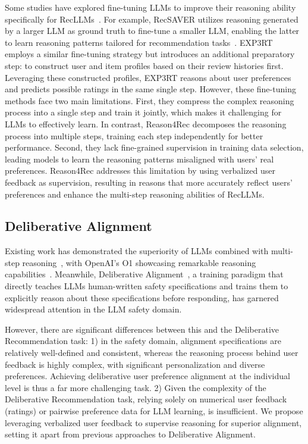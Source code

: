 Some studies have explored fine-tuning LLMs to improve their reasoning ability specifically for RecLLMs~\cite{expert,ACL_findings,ReasoingRec,RecReasonor}. 
For example, RecSAVER utilizes reasoning generated by a larger LLM as ground truth to fine-tune a smaller LLM, enabling the latter to learn reasoning patterns tailored for recommendation tasks~\cite{ACL_findings}.
EXP3RT~\cite{expert} employs a similar fine-tuning strategy but introduces an additional preparatory step: to construct user and item profiles based on their review histories first. 
Leveraging these constructed profiles, EXP3RT reasons about user preferences and predicts possible ratings in the same single step.
However, these fine-tuning methods face two main limitations. First, they compress the complex reasoning process into a single step and train it jointly, which makes it challenging for LLMs to effectively learn. 
In contrast, Reason4Rec decomposes the reasoning process into multiple steps, training each step independently for better performance.
Second, they lack fine-grained supervision in training data selection, leading models to learn the reasoning patterns misaligned with users' real preferences. 
Reason4Rec addresses this limitation by using verbalized user feedback as supervision, resulting in reasons that more accurately reflect users’ preferences and enhance the multi-step reasoning abilities of RecLLMs.

\subsection{Deliberative Alignment}

Existing work has demonstrated the superiority of LLMs combined with multi-step reasoning~\cite{wang2024q}, with OpenAI's O1 showcasing remarkable reasoning capabilities~\cite{openai-o1}. 
Meanwhile, Deliberative Alignment~\cite{guan2024deliberative}, a training paradigm that directly teaches LLMs human-written safety specifications and trains them to explicitly reason about these specifications before responding, has garnered widespread attention in the LLM safety domain. 


However, there are significant differences between this and the Deliberative Recommendation task: 
1) in the safety domain, alignment specifications are relatively well-defined and consistent, whereas the reasoning process behind user feedback is highly complex, with significant personalization and diverse preferences. 
Achieving deliberative user preference alignment at the individual level is thus a far more challenging task. 
2) Given the complexity of the Deliberative Recommendation task, relying solely on numerical user feedback (\eg ratings) or pairwise preference data for LLM learning, is insufficient. We propose leveraging verbalized user feedback to supervise reasoning for superior alignment, setting it apart from previous approaches to Deliberative Alignment. 


